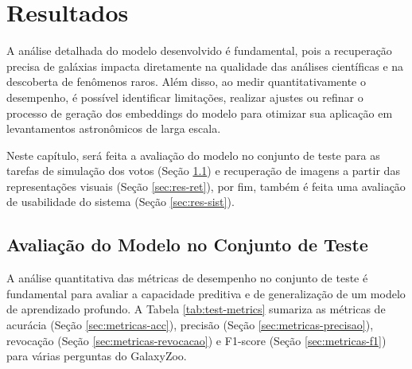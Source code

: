 \chapter{Resultados}
\label{cap:resultados}

A análise detalhada do modelo desenvolvido é fundamental, pois a recuperação precisa de galáxias impacta diretamente na qualidade das análises científicas e na descoberta de fenômenos raros. Além disso, ao medir quantitativamente o desempenho, é possível identificar limitações, realizar ajustes ou refinar o processo de geração dos embeddings do modelo para otimizar sua aplicação em levantamentos astronômicos de larga escala.

Neste capítulo, será feita a avaliação do modelo no conjunto de teste para as tarefas de simulação dos votos (Seção \ref{sec:res-teste}) e recuperação de imagens a partir das representações visuais (Seção \ref{sec:res-ret}), por fim, também é feita uma avaliação de usabilidade do sistema (Seção \ref{sec:res-sist}).





\section{Avaliação do Modelo no Conjunto de Teste}
\label{sec:res-teste}

A análise quantitativa das métricas de desempenho no conjunto de teste é fundamental para avaliar a capacidade preditiva e de generalização de um modelo de aprendizado profundo. A Tabela \ref{tab:test-metrics} sumariza as métricas de acurácia (Seção \ref{sec:metricas-acc}), precisão (Seção \ref{sec:metricas-precisao}), revocação (Seção \ref{sec:metricas-revocacao}) e F1-score (Seção \ref{sec:metricas-f1}) para várias perguntas do GalaxyZoo.

